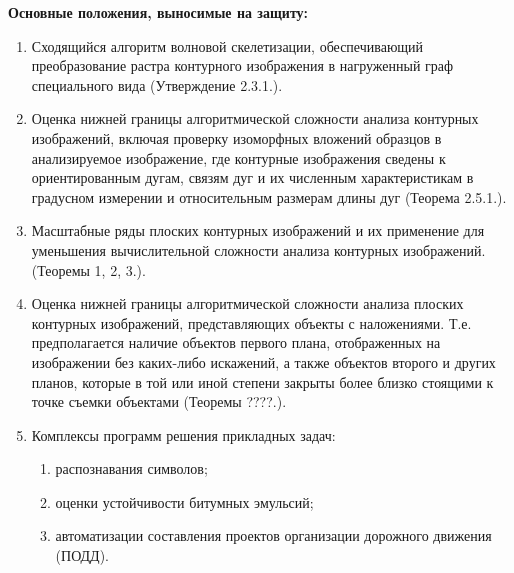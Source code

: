 \textbf{Основные положения, выносимые на защиту:}
\begin{enumerate}

\item Сходящийся алгоритм волновой скелетизации,  обеспечивающий преобразование растра контурного изображения в нагруженный граф специального вида (Утверждение 2.3.1.).
\item Оценка нижней границы алгоритмической сложности  анализа контурных изображений, включая проверку изоморфных вложений образцов в анализируемое изображение, где контурные изображения сведены к ориентированным дугам, связям дуг и их численным характеристикам в градусном измерении и  относительным размерам  длины дуг  (Теорема 2.5.1.).
\item Масштабные ряды плоских контурных изображений и их применение для уменьшения  вычислительной сложности анализа контурных изображений.  (Теоремы 1, 2, 3.).
\item Оценка нижней границы алгоритмической сложности  анализа  плоских контурных изображений, представляющих объекты с наложениями. Т.е. предполагается наличие объектов первого плана, отображенных на изображении без каких-либо искажений,  а также объектов второго и других планов, которые в той или иной степени закрыты более близко стоящими к точке съемки объектами (Теоремы ????.).
\item Комплексы программ  решения прикладных задач:
	\begin{enumerate}
	\item распознавания символов;
	\item оценки устойчивости битумных эмульсий;
	\item автоматизации составления проектов организации дорожного движения (ПОДД). 
	\end{enumerate}   
\end{enumerate}
   
